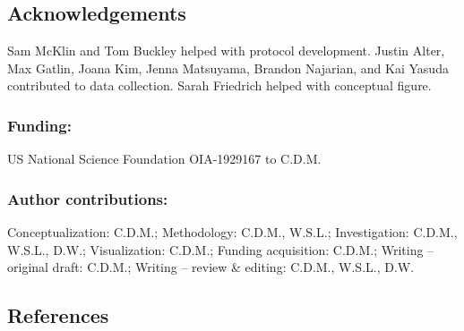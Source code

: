 \documentclass[
  letterpaper,
  DIV=11,
  numbers=noendperiod]{scrartcl}
\begin{document}
\subsection{Acknowledgements}\label{acknowledgements}

Sam McKlin and Tom Buckley helped with protocol development. Justin
Alter, Max Gatlin, Joana Kim, Jenna Matsuyama, Brandon Najarian, and Kai
Yasuda contributed to data collection. Sarah Friedrich helped with
conceptual figure.

\subsubsection{Funding:}\label{funding}

US National Science Foundation OIA-1929167 to C.D.M.

\subsubsection{Author contributions:}\label{author-contributions}

Conceptualization: C.D.M.; Methodology: C.D.M., W.S.L.; Investigation:
C.D.M., W.S.L., D.W.; Visualization: C.D.M.; Funding acquisition:
C.D.M.; Writing -- original draft: C.D.M.; Writing -- review \& editing:
C.D.M., W.S.L., D.W.

\subsection{References}\label{references}
\end{document}
